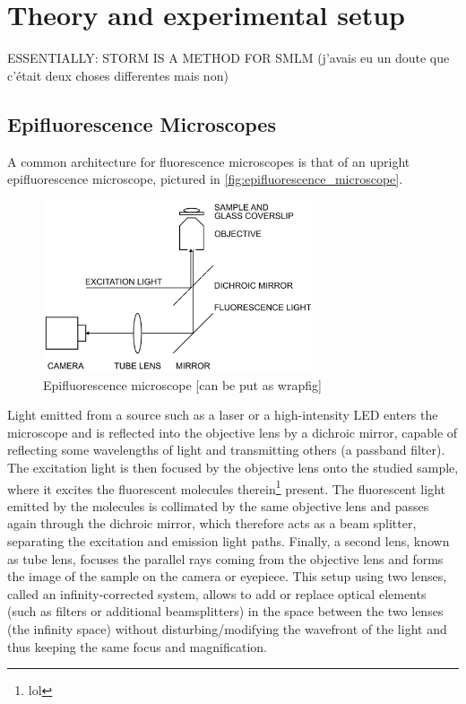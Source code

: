 \section{Theory and experimental setup}
ESSENTIALLY: STORM IS A METHOD FOR SMLM (j'avais eu un doute que c'était deux choses differentes mais non)

\subsection{Epifluorescence Microscopes}
A common architecture for fluorescence microscopes is that of an upright epifluorescence microscope, pictured in \autoref{fig:epifluorescence_microscope}.

\begin{figure}[htbp]  
    \centering
    \includegraphics[width=8cm]{figures/epifluorescence-microscope.png}
    \caption{Epifluorescence microscope \cite{douglass_notice_2023} [can be put as wrapfig]}
    \label{fig:epifluorescence_microscope}
\end{figure}

Light emitted from a source such as a laser or a high-intensity LED enters the microscope and is reflected into the objective lens by a dichroic mirror, capable of reflecting some wavelengths of light and transmitting others (a passband filter)\cite{douglass_notice_2023}.
The excitation light is then focused by the objective lens onto the studied sample, where it excites the fluorescent molecules therein\footnote{lol} present.
The fluorescent light emitted by the molecules is collimated by the same objective lens and passes again through the dichroic mirror, which therefore acts as a beam splitter, separating the excitation and emission light paths\cite{sachl_introduction_2022}.
Finally, a second lens, known as tube lens, focuses the parallel rays coming from the objective lens and forms the image of the sample on the camera or eyepiece.
This setup using two lenses, called an infinity-corrected system, allows to add or replace optical elements (such as filters or additional beamsplitters) in the space between the two lenses (the infinity space) without disturbing/modifying the wavefront of the light and thus keeping the same focus and magnification.

